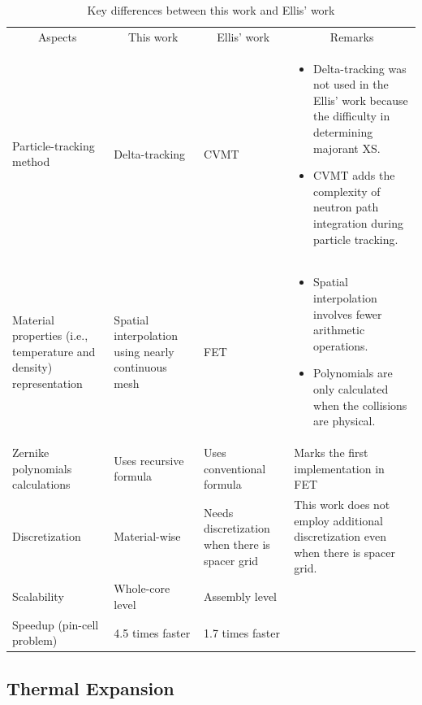 \begin{table}
    \centering
    \setlength{\leftmargini}{0.2cm}
    \caption{Key differences between this work and Ellis' work}
    \label{tab_1q} 
    \begin{tabular}{| m{2.75cm} | m{2.75cm} | m{2.75cm} | m{6cm} | }
        \hline
        \multicolumn{1}{|c|}{Aspects} & \multicolumn{1}{c|}{This work} & \multicolumn{1}{c|}{Ellis' work} & \multicolumn{1}{c|}{Remarks} \\
        \hhline{|=|=|=|=|}
        Particle-tracking method & Delta-tracking & CVMT & 
        \begin{itemize} 
            \item Delta-tracking was not used in the Ellis' work because the difficulty in determining majorant XS.
            \item CVMT adds the complexity of neutron path integration during particle tracking.
        \end{itemize} \\
        \hline
        Material properties (i.e., temperature and density) representation & Spatial interpolation using nearly continuous mesh & FET & 
        \begin{itemize} 
            \item Spatial interpolation involves fewer arithmetic operations.
            \item Polynomials are only calculated when the collisions are physical.
        \end{itemize} \\
        \hline
        Zernike polynomials calculations & Uses recursive formula & Uses conventional formula & Marks the first implementation in FET \\ \hline
        Discretization & Material-wise & Needs discretization when there is spacer grid & This work does not employ additional discretization even when there is spacer grid. \\ \hline
        Scalability & Whole-core level & Assembly level &  \\ \hline
        Speedup (pin-cell problem) & 4.5 times faster & 1.7 times faster &  \\ \hline
    \end{tabular}
\end{table}

\subsection{Thermal Expansion} \label{sec12}

